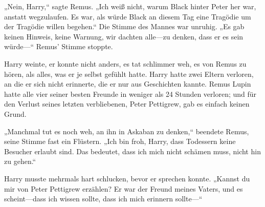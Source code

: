 „Nein, Harry,“ sagte Remus. „Ich weiß nicht, warum Black hinter Peter her war, anstatt wegzulaufen. Es war, als würde Black an diesem Tag eine Tragödie um der Tragödie willen begehen.“ Die Stimme des Mannes war unruhig. „Es gab keinen Hinweis, keine Warnung, wir dachten alle—zu denken, dass er es sein würde—“ Remus' Stimme stoppte.

Harry weinte, er konnte nicht anders, es tat schlimmer weh, es von Remus zu hören, als alles, was er je selbst gefühlt hatte. Harry hatte zwei Eltern verloren, an die er sich nicht erinnerte, die er nur aus Geschichten kannte. Remus Lupin hatte alle vier seiner besten Freunde in weniger als 24 Stunden verloren; und für den Verlust seines letzten verbliebenen, Peter Pettigrew, gab es einfach keinen Grund.

„Manchmal tut es noch weh, an ihn in Askaban zu denken,“ beendete Remus, seine Stimme fast ein Flüstern. „Ich bin froh, Harry, dass Todessern keine Besucher erlaubt sind. Das bedeutet, dass ich mich nicht schämen muss, nicht hin zu gehen.“

Harry musste mehrmals hart schlucken, bevor er sprechen konnte. „Kannst du mir von Peter Pettigrew erzählen? Er war der Freund meines Vaters, und es scheint—dass ich wissen sollte, dass ich mich erinnern sollte—“

